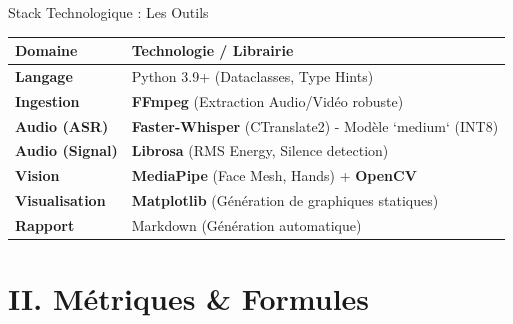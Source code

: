 \documentclass[10pt,aspectratio=169]{beamer}
\begin{document}
\begin{frame}{Stack Technologique : Les Outils}
    \begin{imageframe}
        \small
        \begin{tabular}{lp{}}
            \toprule
            \textbf{Domaine} & \textbf{Technologie / Librairie} \\
            \midrule
            \textbf{Langage} & Python 3.9+ (Dataclasses, Type Hints) \\
            \textbf{Ingestion} & \textbf{FFmpeg} (Extraction Audio/Vidéo robuste) \\
            \textbf{Audio (ASR)} & \textbf{Faster-Whisper} (CTranslate2) - Modèle `medium` (INT8) \\
            \textbf{Audio (Signal)} & \textbf{Librosa} (RMS Energy, Silence detection) \\
            \textbf{Vision} & \textbf{MediaPipe} (Face Mesh, Hands) + \textbf{OpenCV} \\
            \textbf{Visualisation} & \textbf{Matplotlib} (Génération de graphiques statiques) \\
            \textbf{Rapport} & Markdown (Génération automatique) \\
            \bottomrule
        \end{tabular}
    \end{imageframe}
\end{frame}


\section{II. Métriques & Formules}
\end{document}
